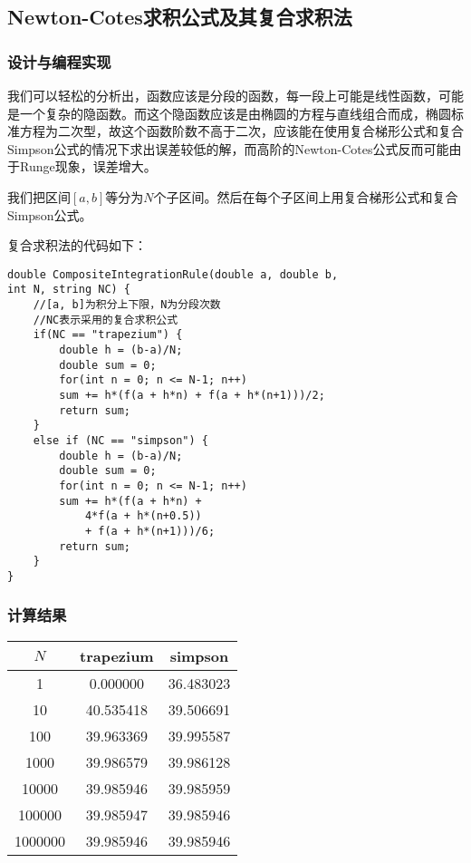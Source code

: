 \documentclass[UTF8]{ctexart}
\begin{document}
	\subsection{Newton-Cotes求积公式及其复合求积法}
	
	\subsubsection{设计与编程实现}
	我们可以轻松的分析出，函数应该是分段的函数，每一段上可能是线性函数，可能是一个复杂的隐函数。而这个隐函数应该是由椭圆的方程与直线组合而成，椭圆标准方程为二次型，故这个函数阶数不高于二次，应该能在使用复合梯形公式和复合Simpson公式的情况下求出误差较低的解，而高阶的Newton-Cotes公式反而可能由于Runge现象，误差增大。
	
	我们把区间$[a, b]$等分为$N$个子区间。然后在每个子区间上用复合梯形公式和复合Simpson公式。
	
	复合求积法的代码如下：
	\lstset{language=C++}%
	
	\begin{lstlisting}
double CompositeIntegrationRule(double a, double b,
int N, string NC) {
	//[a, b]为积分上下限，N为分段次数
	//NC表示采用的复合求积公式
	if(NC == "trapezium") {
		double h = (b-a)/N;
		double sum = 0;
		for(int n = 0; n <= N-1; n++)
		sum += h*(f(a + h*n) + f(a + h*(n+1)))/2;
		return sum;
	}	
	else if (NC == "simpson") {
		double h = (b-a)/N;
		double sum = 0;
		for(int n = 0; n <= N-1; n++)
		sum += h*(f(a + h*n) + 
			4*f(a + h*(n+0.5)) 
			+ f(a + h*(n+1)))/6;
		return sum;
	}					
}
	\end{lstlisting}
	\subsubsection{计算结果}
	\begin{center}
		\begin{tabular}{ |c|c|c| } 
			\hline
			$N$  & trapezium & simpson \\ \hline
			1&0.000000&36.483023\\\hline
			10&40.535418&39.506691\\\hline
			100&39.963369&39.995587\\\hline
			1000&39.986579&39.986128\\\hline
			10000&39.985946&39.985959\\\hline
			100000&39.985947&39.985946\\\hline
			1000000&39.985946&39.985946\\\hline
		\end{tabular}
	\end{center}
\end{document}

